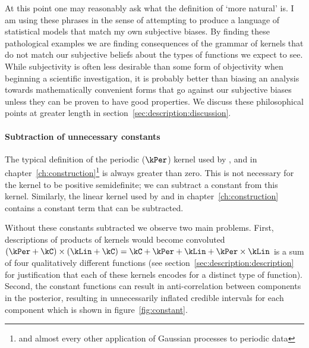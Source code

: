 At this point one may reasonably ask what the definition of `more natural' is.
I am using these phrases in the sense of attempting to produce a language of statistical models that match my own subjective biases.
By finding these pathological examples we are finding consequences of the grammar of kernels that do not match our subjective beliefs about the types of functions we expect to see.
While subjectivity is often less desirable than some form of objectivity when beginning a scientific investigation, it is probably better than biasing an analysis towards mathematically convenient forms that go against our subjective biases unless they can be proven to have good properties.
We discuss these philosophical points at greater length in section~\ref{sec:description:discussion}.

\paragraph{Subtraction of unnecessary constants}

The typical definition of the periodic ($\kPer$) kernel \citep[e.g.][]{Rasmussen2006-ml} used by \citet{Duvenaud2013-dn}, \citet{Kronberger_undated-vf} and in chapter~\ref{ch:construction}\footnote{and almost every other application of Gaussian processes to periodic data} is always greater than zero.
This is not necessary for the kernel to be positive semidefinite; we can subtract a constant from this kernel.
Similarly, the linear kernel used by \citet{Duvenaud2013-dn} and in chapter~\ref{ch:construction} contains a constant term that can be subtracted.

Without these constants subtracted we observe two main problems.
First, descriptions of products of kernels would become convoluted \eg $(\kPer + \kC) \times (\kLin + \kC) = \kC + \kPer + \kLin + \kPer \times \kLin$ is a sum of four qualitatively different functions (see section~\ref{sec:description:description} for justification that each of these kernels encodes for a distinct type of function).
Second, the constant functions can result in anti-correlation between components in the posterior, resulting in unnecessarily inflated credible intervals for each component which is shown in figure~\ref{fig:constant}.

